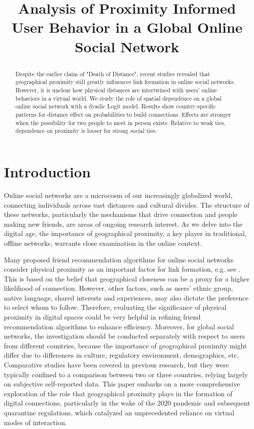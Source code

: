 
\title{Analysis of Proximity Informed User
Behavior in a Global Online Social Network

}
\maketitle

\begin{abstract}
Despite the earlier claim of "Death of Distance", recent studies revealed that geographical proximity still greatly influences link formation in online social networks. However, it is unclear how physical distances are intertwined with users' online behaviors in a virtual world. We study the role of spatial dependence on a global online social network with a dyadic Logit model. Results show country-specific patterns for distance effect on probabilities to build connections. Effects are stronger when the possibility for two people to meet in person exists. Relative to weak ties, dependence on proximity is looser for strong social ties.
\end{abstract}


\section{Introduction}

Online social networks are a microcosm of our increasingly globalized world, connecting individuals across vast distances and cultural divides. The structure of these networks, particularly the mechanisms that drive connection and people making new friends, are areas of ongoing research interest. As we delve into the digital age, the importance of geographical proximity, a key player in traditional, offline networks, warrants close examination in the online context.

Many proposed friend recommendation algorithms for online social networks consider physical proximity as an important factor for link formation, e.g. see \cite{xie2010potential, chin2013should, chin2012linking,wang2011interplay}. This is based on the belief that geographical closeness can be a proxy for a higher likelihood of connection. However, other factors, such as users' ethnic group, native language, shared interests and experiences, may also dictate the preference to select whom to follow. Therefore, evaluating the significance of physical proximity in digital spaces could be very helpful in refining friend recommendation algorithms to enhance efficiency. Moreover, for global social networks, the investigation should be conducted separately with respect to users from different countries, because the importance of geographical proximity might differ due to differences in culture, regulatory environment, demographics, etc. Comparative studies have been covered in previous research, but they were typically confined to a comparison between two or three countries, relying largely on subjective self-reported data. This paper embarks on a more comprehensive exploration of the role that geographical proximity plays in the formation of digital connections, particularly in the wake of the 2020 pandemic and subsequent quarantine regulations, which catalyzed an unprecedented reliance on virtual modes of interaction.


